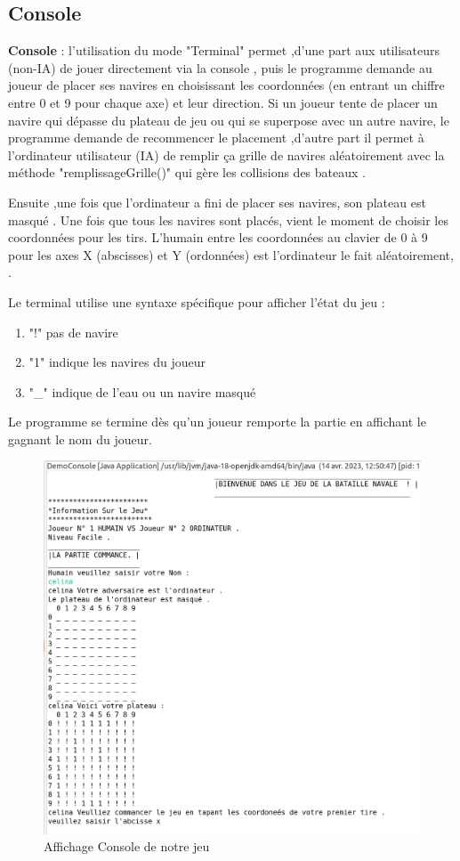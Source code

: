 \documentclass{rapport}
\begin{document}
{\subsection{Console}
\textbf{Console} : l'utilisation du mode "Terminal" permet ,d'une part aux utilisateurs (non-IA) de jouer directement via la console , puis le programme demande au joueur de placer ses navires en choisissant les coordonnées (en entrant un chiffre entre 0 et 9 pour chaque axe) et leur direction. Si un joueur tente de placer un navire qui dépasse du plateau de jeu ou qui se superpose avec un autre navire, le programme demande de recommencer le placement ,d'autre part il permet à l'ordinateur utilisateur (IA) de remplir ça grille de navires aléatoirement avec la méthode "remplissageGrille()" qui gère les collisions des bateaux .

Ensuite ,une fois que l'ordinateur a fini de placer ses navires, son plateau est masqué . Une fois que tous les navires sont placés, vient le moment de choisir les coordonnées pour les tirs. L'humain entre les coordonnées au clavier de 0 à 9 pour les axes X (abscisses) et Y (ordonnées) est l'ordinateur le fait aléatoirement, .

Le terminal utilise une syntaxe spécifique pour afficher l'état du jeu :
\begin{enumerate}
    \item "!" pas de navire
    \item "1" indique les navires du joueur
    \item "\_" indique de l'eau ou un navire masqué
\end{enumerate}



Le programme se termine dès qu'un joueur remporte la partie en affichant le gagnant le nom du joueur.

\begin{figure}[h]
\centering
\includegraphics[scale=0.3]{images/DemoConsole.png}
\caption{Affichage Console de notre jeu }
\end{figure}
\newpage
}
\end{document}
